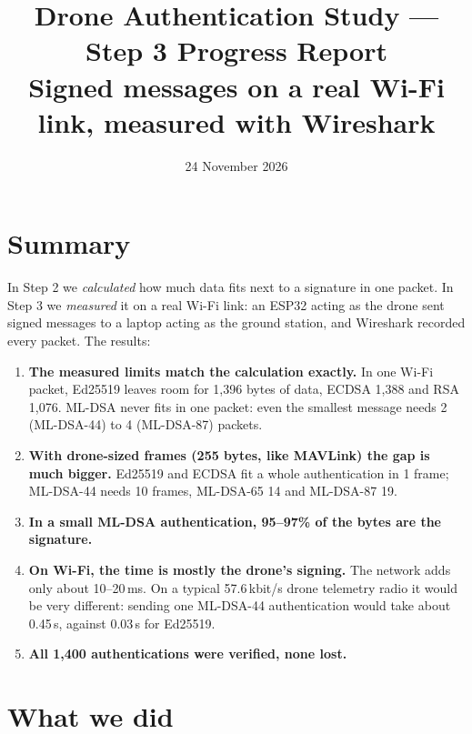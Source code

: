 \documentclass[10pt,a4paper]{article}
\title{Drone Authentication Study --- Step 3 Progress Report\\[3pt]
\large Signed messages on a real Wi-Fi link, measured with Wireshark}
\author{}
\date{24 November 2026}
\begin{document}
\maketitle

\section*{Summary}

In Step 2 we \emph{calculated} how much data fits next to a signature in one packet. In Step 3
we \emph{measured} it on a real Wi-Fi link: an ESP32 acting as the drone sent signed messages to
a laptop acting as the ground station, and Wireshark recorded every packet. The results:

\begin{enumerate}[nosep]
  \item \textbf{The measured limits match the calculation exactly.} In one Wi-Fi packet, Ed25519
        leaves room for 1,396 bytes of data, ECDSA 1,388 and RSA 1,076. ML-DSA never fits in one
        packet: even the smallest message needs 2 (ML-DSA-44) to 4 (ML-DSA-87) packets.
  \item \textbf{With drone-sized frames (255 bytes, like MAVLink) the gap is much bigger.} Ed25519
        and ECDSA fit a whole authentication in 1 frame; ML-DSA-44 needs 10 frames, ML-DSA-65 14
        and ML-DSA-87 19.
  \item \textbf{In a small ML-DSA authentication, 95--97\% of the bytes are the signature.}
  \item \textbf{On Wi-Fi, the time is mostly the drone's signing.} The network adds only about
        10--20\,ms. On a typical 57.6\,kbit/s drone telemetry radio it would be very different: sending
        one ML-DSA-44 authentication would take about 0.45\,s, against 0.03\,s for Ed25519.
  \item \textbf{All 1,400 authentications were verified, none lost.}
\end{enumerate}

\section{What we did}
\end{document}
